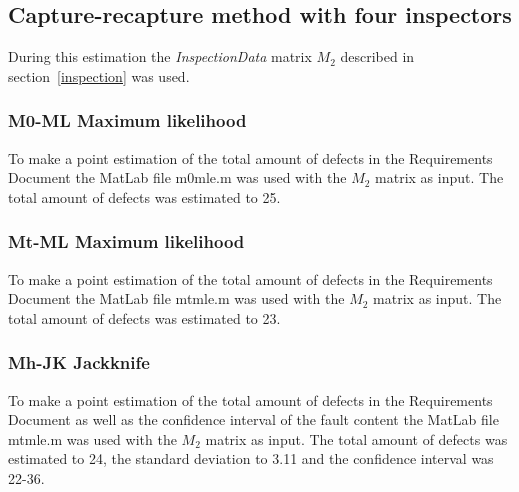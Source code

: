 \subsection{Capture-recapture method with four inspectors}
During this estimation the \textit{InspectionData} matrix $M_{2}$ described in section~\ref{inspection} was used.
\subsubsection{M0-ML Maximum likelihood}
To make a point estimation of the total amount of defects in the Requirements Document the MatLab file m0mle.m was used with the $M_{2}$ matrix as input. The total amount of defects was estimated to 25.
\subsubsection{Mt-ML Maximum likelihood}
To make a point estimation of the total amount of defects in the Requirements Document the MatLab file mtmle.m was used with the $M_{2}$ matrix as input. The total amount of defects was estimated to 23.
\subsubsection{Mh-JK Jackknife}
To make a point estimation of the total amount of defects in the Requirements Document as well as the confidence interval of the fault content the MatLab file mtmle.m was used with the $M_{2}$ matrix as input. The total amount of defects was estimated to 24, the standard deviation to 3.11 and the confidence interval was 22-36.
